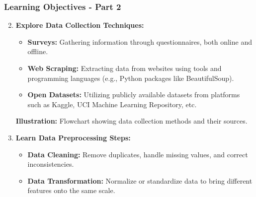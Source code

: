 \documentclass[aspectratio=169]{beamer}
\begin{document}
\begin{frame}[fragile]
    \frametitle{Learning Objectives - Part 2}
    \begin{enumerate}
        \setcounter{enumi}{1}
        \item \textbf{Explore Data Collection Techniques:}
        \begin{itemize}
            \item \textbf{Surveys:} Gathering information through questionnaires, both online and offline.
            \item \textbf{Web Scraping:} Extracting data from websites using tools and programming languages (e.g., Python packages like BeautifulSoup).
            \item \textbf{Open Datasets:} Utilizing publicly available datasets from platforms such as Kaggle, UCI Machine Learning Repository, etc.
        \end{itemize}
        \textbf{Illustration:} Flowchart showing data collection methods and their sources.
        
        \item \textbf{Learn Data Preprocessing Steps:}
        \begin{itemize}
            \item \textbf{Data Cleaning:} Remove duplicates, handle missing values, and correct inconsistencies.
            \item \textbf{Data Transformation:} Normalize or standardize data to bring different features onto the same scale.
        \end{itemize}
    \end{enumerate}
\end{frame}
\end{document}
